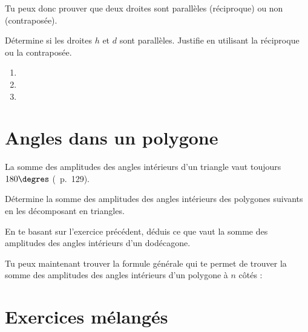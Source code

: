 \documentclass[../math2.tex]{subfiles}
\begin{document}
 Tu peux donc prouver que deux droites sont parallèles (réciproque) ou non (contraposée).

\begin{exercise}
    Détermine si les droites $h$ et $d$ sont parallèles. Justifie en utilisant la réciproque ou la contraposée.
    \begin{enumerate}
        \item 
        \item 
        \item 
    \end{enumerate}
\end{exercise}

\section{Angles dans un polygone}
La somme des amplitudes des angles intérieurs d'un triangle vaut toujours $180\degres$ (~p.~129).
\begin{exercise}
    Détermine la somme des amplitudes des angles intérieurs des polygones suivants en les décomposant en triangles.
    \begin{center}
        
        \hfil
        
        \hfil
        
        \hfil
        
    \end{center}
\end{exercise}
\begin{exercise}
    En te basant sur l'exercice précédent, déduis ce que vaut la somme des amplitudes des angles intérieurs d'un dodécagone.
    \vspace*{3cm}
\end{exercise}

Tu peux maintenant trouver la formule générale qui te permet de trouver la somme des amplitudes des angles intérieurs d'un polygone à $n$ côtés :
\vspace*{3cm}

\newpage
\section{Exercices mélangés}
\end{document}
